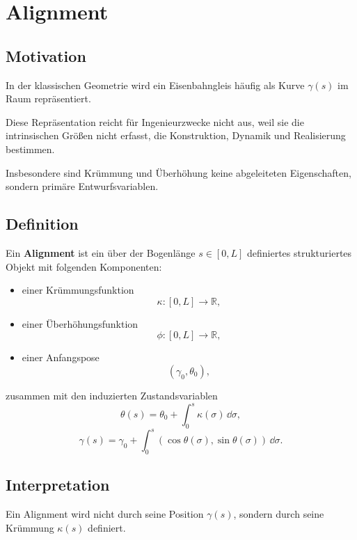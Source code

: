 
\section{Alignment}

\subsection{Motivation}

In der klassischen Geometrie wird ein Eisenbahngleis häufig als Kurve
\(\gamma(s)\) im Raum repräsentiert.

Diese Repräsentation reicht für Ingenieurzwecke nicht aus, weil sie die
intrinsischen Größen nicht erfasst, die Konstruktion, Dynamik und Realisierung
bestimmen.

Insbesondere sind Krümmung und Überhöhung keine abgeleiteten Eigenschaften,
sondern primäre Entwurfsvariablen.

\subsection{Definition}

\begin{definition}[Alignment]
Ein \textbf{Alignment} ist ein über der Bogenlänge
\(s \in [0,L]\) definiertes strukturiertes Objekt mit folgenden Komponenten:

\begin{itemize}
\item einer Krümmungsfunktion
\[
\kappa : [0,L] \rightarrow \mathbb{R},
\]

\item einer Überhöhungsfunktion
\[
\phi : [0,L] \rightarrow \mathbb{R},
\]

\item einer Anfangspose
\[
(\gamma_0, \theta_0),
\]
\end{itemize}

zusammen mit den induzierten Zustandsvariablen
\[
\theta(s) = \theta_0 + \int_0^s \kappa(\sigma)\,\dd\sigma,
\]
\[
\gamma(s) = \gamma_0 + \int_0^s
(\cos\theta(\sigma), \sin\theta(\sigma))\,\dd\sigma.
\]
\end{definition}

\subsection{Interpretation}

Ein Alignment wird nicht durch seine Position \(\gamma(s)\), sondern durch
seine Krümmung \(\kappa(s)\) definiert.

